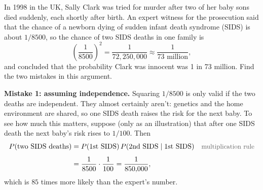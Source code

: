 \begin{example}\label{ex:clark}
In 1998 in the UK, Sally Clark was tried for murder after two of her baby sons died suddenly, each shortly after birth. An expert witness for the prosecution said that the chance of a newborn dying of sudden infant death syndrome (SIDS) is about $1/8500$, so the chance of two SIDS deaths in one family is
\[
\left(\frac{1}{8500}\right)^{2} = \frac{1}{72{,}250{,}000} \approx \frac{1}{73\text{ million}},
\]
and concluded that the probability Clark was innocent was 1 in 73 million. Find the two mistakes in this argument.
\end{example}
\begin{solution}
\textbf{Mistake 1: assuming independence.} Squaring $1/8500$ is only valid if the two deaths are independent. They almost certainly aren't: genetics and the home environment are shared, so one SIDS death raises the risk for the next baby. To see how much this matters, suppose (only as an illustration) that after one SIDS death the next baby's risk rises to $1/100$. Then
\begin{align*}
P(\text{two SIDS deaths})
  &= P(\text{1st SIDS})\,P(\text{2nd SIDS} \mid \text{1st SIDS})
  && \by{multiplication rule} \\[0.4em]
  &= \frac{1}{8500} \cdot \frac{1}{100}
   = \frac{1}{850{,}000},
\end{align*}
which is $85$ times more likely than the expert's number.


\end{solution}

